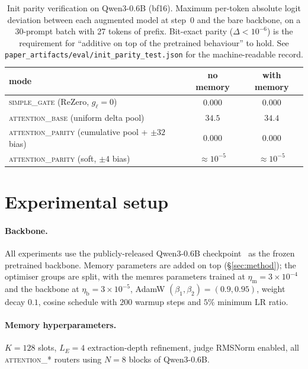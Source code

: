 \documentclass{article}
\begin{document}
\begin{table}[t]
\centering
\caption{Init parity verification on Qwen3-0.6B (bf16). Maximum
per-token absolute logit deviation between each augmented model at
step~0 and the bare backbone, on a 30-prompt batch with 27 tokens of
prefix. Bit-exact parity ($\Delta < 10^{-6}$) is the requirement for
``additive on top of the pretrained behaviour'' to hold. See
\texttt{paper\_artifacts/eval/init\_parity\_test.json} for the
machine-readable record.}
\label{tab:init_parity}
\begin{tabular}{lcc}
\toprule
mode & no memory & with memory \\
\midrule
\textsc{simple\_gate} (ReZero, $g_\ell{=}0$) & $0.000$ & $0.000$ \\
\textsc{attention\_base} (uniform delta pool)  & $34.5$ & $34.4$ \\
\textsc{attention\_parity} (cumulative pool + $\pm 32$ bias) & $0.000$ & $0.000$ \\
\textsc{attention\_parity} (soft, $\pm 4$ bias)              & $\approx 10^{-5}$ & $\approx 10^{-5}$ \\
\bottomrule
\end{tabular}
\end{table}

\section{Experimental setup}
\label{sec:setup}

\paragraph{Backbone.}
All experiments use the publicly-released Qwen3-0.6B
checkpoint~\cite{qwen3} as the frozen pretrained backbone. Memory
parameters are added on top (\S\ref{sec:method}); the optimiser
groups are split, with the memres parameters trained at $\eta_{\text{m}} = 3\!\times\!10^{-4}$
and the backbone at $\eta_{\text{b}} = 3\!\times\!10^{-5}$, AdamW
$(\beta_1, \beta_2) = (0.9, 0.95)$, weight decay $0.1$, cosine schedule with
$200$ warmup steps and $5\%$ minimum LR ratio.

\paragraph{Memory hyperparameters.} $K = 128$ slots, $L_E = 4$
extraction-depth refinement, judge RMSNorm enabled, all
\textsc{attention\_*} routers using $N = 8$ blocks of Qwen3-0.6B.
\end{document}
